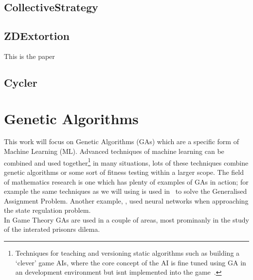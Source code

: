 \subsection{CollectiveStrategy}\label{subsec:collectiveStrategy}
\subsection{ZDExtortion}\label{subsec:zdExtortion}
This is the paper~\cite{press2012iterated}
\subsection{Cycler}\label{subsec:cycler}

\section{Genetic Algorithms}
This work will focus on Genetic Algorithms (GAs) which are a specific form of Machine Learning (ML).
Advanced techniques of machine learning can be combined and used together\footnote{Techniques for teaching and versioning static algorithms such as building a `clever' game AIs, where the core concept of the AI is fine tuned using GA in an development environment but isnt implemented into the game~\cite{bakkes2009rapid}.} in many situations, lots of these techniques combine genetic algorithms or some sort of fitness testing within a larger scope.
The field of mathematics research is one which has plenty of examples of GAs in action;
for example the same techniques as we will using is used in~\cite{chu1997genetic} to solve the Generalised Assignment Problem.
Another example, \cite{bhanu1995adaptive}, used neural networks when approaching the state regulation problem. \\

In Game Theory GAs are used in a couple of areas, most prominanly in the study of the interated prisonrs dilema.